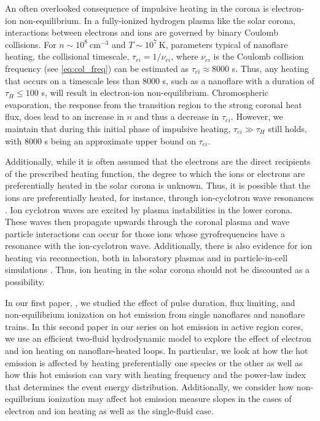 \documentclass[apj]{emulateapj}
\begin{document}
	\par An often overlooked consequence of impulsive heating in the corona is electron-ion non-equilibrium. In a fully-ionized hydrogen plasma like the solar corona, interactions between electrons and ions are governed by binary Coulomb collisions. For $n\sim10^8~\mathrm{cm}^{-3}$ and $T\sim10^7~\mathrm{K}$, parameters typical of nanoflare heating, the collisional timescale, $\tau_{ei}=1/\nu_{ei}$, where $\nu_{ei}$ is the Coulomb collision frequency (see \autoref{eq:col_freq}) can be estimated as $\tau_{ei}\approx8000$ s. Thus, any heating that occurs on a timescale less than 8000 s, such as a nanoflare with a duration of $\tau_H\le100$ s, will result in electron-ion non-equilibrium. Chromospheric evaporation, the response from the transition region to the strong coronal heat flux, does lead to an increase in $n$ and thus a decrease in $\tau_{ei}$. However, we maintain that during this initial phase of impulsive heating, $\tau_{ei}\gg\tau_H$ still holds, with 8000 s being an approximate upper bound on $\tau_{ei}$. 
	\par Additionally, while it is often assumed that the electrons are the direct recipients of the prescribed heating function, the degree to which the ions or electrons are preferentially heated in the solar corona is unknown. Thus, it is possible that the ions are preferentially heated, for instance, through ion-cyclotron wave resonances \citep{markovskii_intermittent_2004}. Ion cyclotron waves are excited by plasma instabilities in the lower corona. These waves then propagate upwards through the coronal plasma and wave particle interactions can occur for those ions whose gyrofrequencies have a resonance with the ion-cyclotron wave. Additionally, there is also evidence for ion heating via reconnection, both in laboratory plasmas and in particle-in-cell simulations \citep{ono_ion_1996,yoo_bulk_2014,drake_onset_2014}. Thus, ion heating in the solar corona should not be discounted as a possibility.
	\par In our first paper, \citet{cargill_hot_2016} , we studied the effect of pulse duration, flux limiting, and non-equilibrium ionization on hot emission from single nanoflares and nanoflare trains. In this second paper in our series on hot emission in active region cores, we use an efficient two-fluid hydrodynamic model to explore the effect of electron and ion heating on nanoflare-heated loops. In particular, we look at how the hot emission is affected by heating preferentially one species or the other as well as how this hot emission can vary with heating frequency and the power-law index that determines the event energy distribution. Additionally, we consider how non-equilbrium ionization may affect hot emission measure slopes in the cases of electron and ion heating as well as the single-fluid case.
\end{document}
